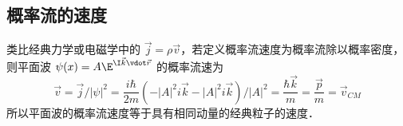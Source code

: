 \subsection{概率流的速度}

类比经典力学或电磁学中的 $\vec j = \rho \vec v$，若定义概率流速度为概率流除以概率密度，则平面波 $\psi (x) = A{\E^{\I \vec k \vdot \vec r}}$ 的概率流速为
\begin{equation}
\vec v = \vec j/{\left| \psi  \right|^2} = \frac{i\hbar }{2m}\left( { - {{\left| A \right|}^2}i\vec k - {{\left| A \right|}^2}i\vec k} \right)/{\left| A \right|^2} = \frac{\hbar \vec k}{m} = \frac{\vec p}{m} = {\vec v_{CM}}
\end{equation}
所以平面波的概率流速度等于具有相同动量的经典粒子的速度．
